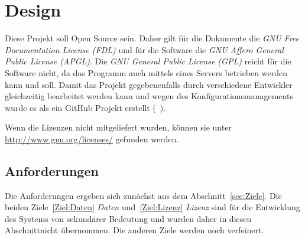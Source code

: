 \documentclass[english,ngerman,parskip=half,headsepline,footsepline]{scrreprt}
\newcommand{\sectionname}{Abschnitt}
\begin{document}

	\chapter{Design} %

	\thispagestyle{scrheadings}

	Diese Projekt soll Open Source sein. Daher gilt für die Dokumente die \emph{GNU Free Documentation License (FDL)} und für die Software die \emph{GNU Affero General Public License (APGL)}. Die \emph{GNU General Public License (GPL)} reicht für die Software nicht, da das Programm auch mittels eines Servers betrieben werden kann und soll. Damit das Projekt gegebenenfalls durch verschiedene Entwickler gleichzeitig bearbeitet werden kann und wegen des Konfigurationsmanagements wurde es als ein GitHub Projekt erstellt (\seename~\cite{bib:ASBA}).

	Wenn die Lizenzen nicht mitgeliefert wurden, können sie unter \url{http://www.gnu.org/licenses/} gefunden werden.

	\section{Anforderungen}
	\label{Anforderungen}

	Die Anforderungen ergeben sich zunächst aus dem \sectionname~\vref{sec:Ziele}. Die beiden Ziele~\ref{Ziel:Daten} \emph{Daten} und~\ref{Ziel:Lizenz} \emph{Lizenz} sind für die Entwicklung des Systems von sekundärer Bedeutung und wurden daher in diesen \sectionname nicht übernommen. Die anderen Ziele werden noch verfeinert.
\end{document}
